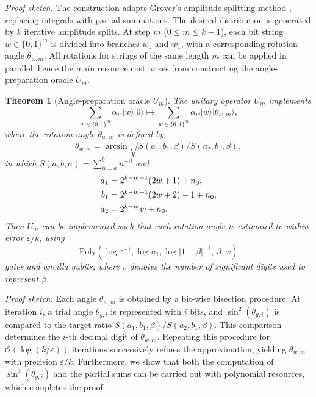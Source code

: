 \documentclass[aps,pra,twocolumn,superscriptaddress,preprintnumbers,amsmath,amssymb]{revtex4-2}
\newtheorem{Theorem}{Theorem}
\begin{document}
\noindent
\emph{Proof sketch.}  
The construction adapts Grover's amplitude splitting method \cite{grover2002creating}, replacing integrals with partial summations.  The desired distribution is generated by $k$ iterative amplitude splits. At step $m$ ($0 \le m \le k-1$), each bit string $w\in\{0,1\}^m$ is divided into branches $w_0$ and $w_1$, %
with a corresponding rotation angle $\theta_{w,m}$. 
All rotations for strings of the same length $m$ can be applied in parallel; hence the main resource cost arises from constructing the angle-preparation oracle $U_m$.
\begin{Theorem}[Angle-preparation oracle $U_m$]\label{Th:U}
The unitary operator $U_m$ implements
\begin{equation}
\textstyle\sum\limits_{w\in \{0,1\}^m}\alpha_w|w\rangle|0\rangle\mapsto\textstyle\sum\limits_{w\in \{0,1\}^m}\alpha_w|w\rangle|\theta_{w,m}\rangle,
\end{equation} where the rotation angle $\theta_{w,m}$ is defined by
\begin{equation}
      \theta_{w,m}=\arcsin{\sqrt{S(a_1,b_1,\beta)/S(a_2,b_1,\beta)}},
\end{equation}
in which $S(a,b,\sigma)=\textstyle\sum_{n=a}^b n^{-\beta}$ and
\begin{align}
    a_1&=2^{k-m-1}(2w+1)+n_0,\notag\\
    b_1&=2^{k-m-1}(2w+2)-1+n_0,\notag\\
    a_2&=2^{k-m}w+n_0.
\end{align}
Then $U_m$ can be implemented such that each rotation angle is estimated to within error $\varepsilon/k$, using
\begin{equation}
\mathrm{Poly}(\log \varepsilon^{-1},\log n_1,\log|1-\beta|^{-1},\,\beta,\,v)
\end{equation}
gates and ancilla qubits, where $v$ denotes the number of significant digits used to represent $\beta$.
\end{Theorem}
\noindent
\emph{Proof sketch.}  
Each angle $\theta_{w,m}$ is obtained by a bit-wise bisection procedure.
At iteration $i$, a trial angle $\theta_{g,i}$ is represented with $i$ bits, and 
$\sin^2(\theta_{g,i})$ is  compared  to the target ratio $S(a_1,b_1,\beta)/S(a_2,b_1,\beta)$. This comparison determines the $i$-th decimal digit of $\theta_{w,m}$. Repeating this procedure for $\mathcal{O}(\log(k/\varepsilon))$ iterations successively refines the approximation, yielding $\theta_{w,m}$ with precision $\varepsilon/k$. Furthermore, we show that both the computation of $\sin^2(\theta_{g,i})$ and the partial sums  can be carried out with polynomial resources, which completes the proof.
\end{document}
